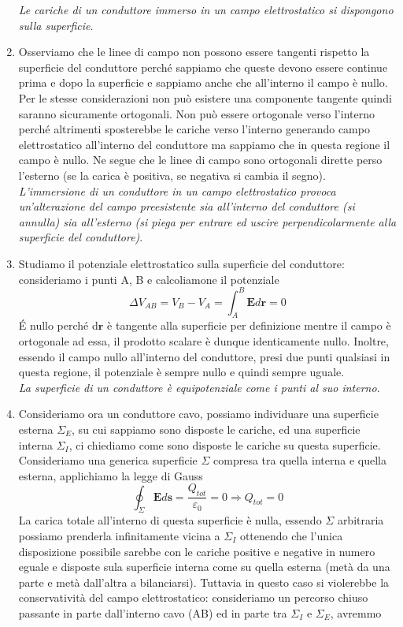 \documentclass[
10pt, %
a4paper, %
oneside, %
headinclude,footinclude, %
BCOR5mm, %
]{scrartcl}
\begin{document}
\begin{enumerate}
\textit{Le cariche di un conduttore immerso in un campo elettrostatico si dispongono sulla superficie}.
\item Osserviamo che le linee di campo non possono essere tangenti rispetto la superficie del conduttore perché sappiamo che queste devono essere continue prima e dopo la superficie e sappiamo anche che all'interno il campo è nullo. Per le stesse considerazioni non può esistere una componente tangente quindi saranno sicuramente ortogonali. Non può essere ortogonale verso l'interno perché altrimenti sposterebbe le cariche verso l'interno generando campo elettrostatico all'interno del conduttore ma sappiamo che in questa regione il campo è nullo. Ne segue che le linee di campo sono ortogonali dirette perso l'esterno (se la carica è positiva, se negativa si cambia il segno).\\
\textit{L'immersione di un conduttore in un campo elettrostatico provoca un'alterazione del campo preesistente sia all'interno del conduttore (si annulla) sia all'esterno (si piega per entrare ed uscire perpendicolarmente alla superficie del conduttore)}.
\item Studiamo il potenziale elettrostatico sulla superficie del conduttore: consideriamo i punti A, B e calcoliamone il potenziale
\[\Delta V_{AB} = V_B - V_A = \int_A^B \mathbf{E}d\mathbf{r} = 0\]
\'E nullo perché d$\mathbf{r}$ è tangente alla superficie per definizione mentre il campo è ortogonale ad essa, il prodotto scalare è dunque identicamente nullo. Inoltre, essendo il campo nullo all'interno del conduttore, presi due punti qualsiasi in questa regione, il potenziale è sempre nullo e quindi sempre uguale.\\
\textit{La superficie di un conduttore è equipotenziale come i punti al suo interno}.
\item Consideriamo ora un conduttore cavo, possiamo individuare una superficie esterna $\Sigma_E$, su cui sappiamo sono disposte le cariche, ed una superficie interna $\Sigma_I$, ci chiediamo come sono disposte le cariche su questa superficie. Consideriamo una generica superficie $\Sigma$ compresa tra quella interna e quella esterna, applichiamo la legge di Gauss
\[\oint_\Sigma \mathbf{E}d\mathbf{s} = \frac{Q_{tot}}{\varepsilon_0} = 0 \Rightarrow Q_{tot} = 0\]
La carica totale all'interno di questa superficie è nulla, essendo $\Sigma$ arbitraria possiamo prenderla infinitamente vicina a $\Sigma_I$ ottenendo che l'unica disposizione possibile sarebbe con le cariche positive e negative in numero eguale e disposte sula superficie interna come su quella esterna (metà da una parte e metà dall'altra a bilanciarsi). Tuttavia in questo caso si violerebbe la conservatività del campo elettrostatico: consideriamo un percorso chiuso passante in parte dall'interno cavo (AB) ed in parte tra $\Sigma_I$ e $\Sigma_E$, avremmo

\end{enumerate}
\end{document}
